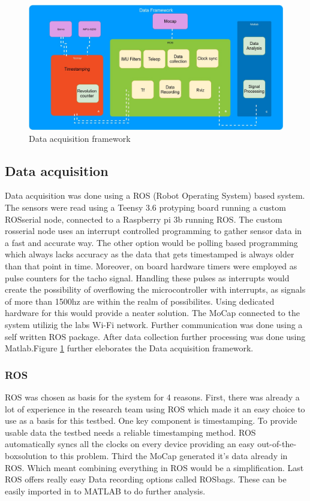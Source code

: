 \begin{figure}
  \centering
    \includegraphics[scale=0.22]{figure/DataFramework.jpg}
  \caption{Data acquisition framework}
  \label{fig:DonutFramework} 
\end{figure}

\subsection{Data acquisition}
Data acquisition was done using a ROS (Robot Operating System) based system. The sensors were read using a Teensy 3.6 protyping board running a custom ROSserial node, connected to a Raspberry pi 3b running ROS. The custom rosserial node uses an interrupt controlled programming to gather sensor data in a fast and accurate way. The other option would be polling based programming which always lacks accuracy as the data that gets timestamped is always older than that point in time. Moreover, on board hardware timers were employed as pulse counters for the tacho signal. Handling these pulses as interrupts would create the possibility of overflowing the microcontroller with interrupts, as signals of more than 1500hz are within the realm of possibilites. Using dedicated hardware for this would provide a neater solution.
The MoCap connected to the system utilizig the labs Wi-Fi network. Further communication was done using a self written ROS package. After data collection further processing was done using Matlab.Figure
\ref{fig:DonutFramework} further eleborates the Data acquisition framework.
\subsubsection{ROS}
ROS was chosen as basis for the system for 4 reasons. First, there was already a lot of experience in the research team using ROS which made it an easy choice to use as a basis for this testbed. One key component is timestamping. To provide usable data the testbed needs a reliable timestamping method. ROS automatically syncs all the clocks on every device providing an easy \textquotesingle out-of-the-box\textquotesingle  solution to this problem. Third the MoCap generated it's data already in ROS. Which meant combining everything in ROS would be a simplification. Last ROS offers really easy Data recording options called ROSbags. These can be easily imported in to MATLAB to do further analysis.
